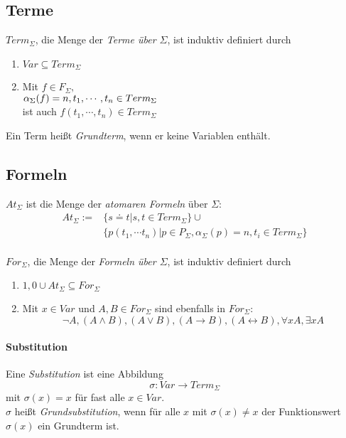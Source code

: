 \documentclass{article}
\begin{document}
\subsection{Terme}
$Term_\Sigma$, die Menge der \textit{Terme \"uber $\Sigma$}, ist induktiv definiert durch
\begin{enumerate}
    \item $Var \subseteq Term_\Sigma$
    \item Mit $f \in F_\Sigma, $ \\
        $\alpha_\Sigma(f) = n, \\
        t_1, \cdots, t_n \in Term_\Sigma$ \\
        ist auch $f(t_1, \cdots, t_n) \in Term_\Sigma$
\end{enumerate}
Ein Term hei{\ss}t \textit{Grundterm}, wenn er keine Variablen enth\"alt.

\subsection{Formeln}
$At_\Sigma$ ist die Menge der \textit{atomaren Formeln} \"uber $\Sigma$:
\begin{align*}
    At_\Sigma := & \{s \doteq t | s,t \in Term_\Sigma \} \cup \\
    & \{ p(t_1, \cdots t_n) | p \in P_\Sigma, \alpha_\Sigma(p) = n,
    t_i \in Term_\Sigma \}
\end{align*}
\\
$For_\Sigma$, die Menge der \textit{Formeln \"uber $\Sigma$}, ist 
induktiv definiert durch
\begin{enumerate}
    \item ${1, 0} \cup At_\Sigma \subseteq For_\Sigma$
    \item Mit $x \in Var$ und $A, B \in For_\Sigma$ sind ebenfalls in 
        $For_\Sigma$: 
        \[ \lnot A, (A \land B), (A \lor B), (A \rightarrow B),
        (A \leftrightarrow B), \forall xA, \exists xA \]
\end{enumerate}

\paragraph{Substitution}
Eine \textit{Substitution} ist eine Abbildung
\[ \sigma : Var \rightarrow Term_\Sigma \]
mit $\sigma(x) = x$ f\"ur fast alle $x \in Var$. \\
$\sigma$ hei{\ss}t \textit{Grundsubstitution}, wenn f\"ur alle $x$ mit
$\sigma(x) \neq x$ der Funktionswert $\sigma(x)$ ein Grundterm ist. \\
\end{document}
